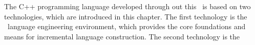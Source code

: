 
The C++ programming language developed through out this \MT\ is based on two technologies, which are 
introduced in this chapter. The first technology is the \jbmps\ language engineering environment, which 
provides the core foundations and means for incremental language construction. The second technology is
the \mbdp\ 





